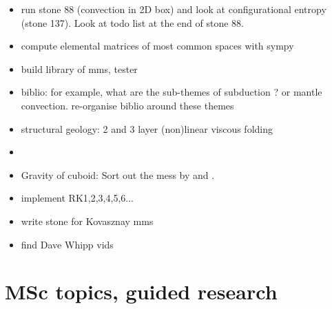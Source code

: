 \documentclass[a4paper]{article}
\begin{document}
\begin{itemize}
\item run stone 88 (convection in 2D box) and look at configurational entropy 
(stone 137). Look at todo list at the end of stone 88.
\item compute elemental matrices of most common spaces with sympy
\item build library of mms, tester
\item biblio: for example, what are the sub-themes of subduction ? 
or mantle convection. re-organise biblio around these themes
\item structural geology: 2 and 3 layer (non)linear viscous folding
\item {}
\item Gravity of cuboid: Sort out the mess by \textcite{duti16} and \textcite{zhhu17}.
\item implement RK1,2,3,4,5,6...
\item write stone for Kovasznay mms
\item find Dave Whipp vids
\end{itemize}

\newpage
\section{MSc topics, guided research}
\end{document}
